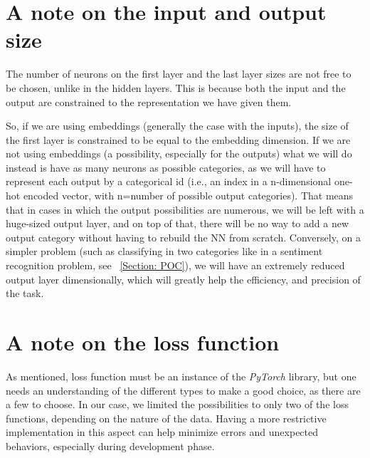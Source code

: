 \documentclass[a4paper, 11pt]{report}
\begin{document}
\section{A note on the input and output size}\label{Apx: input and output sizes}
   The number of neurons on the first layer and the last layer sizes are not free to be chosen, unlike in the hidden layers. This is because both the input and the output are constrained to the representation we have given them.

   So, if we are using embeddings (generally the case with the inputs), the size of the first layer is constrained to be equal to the embedding dimension. If we are not using embeddings (a possibility, especially for the outputs) what we will do instead is have as many neurons as possible categories, as we will have to represent each output by a categorical id (i.e., an index in a n-dimensional one-hot encoded vector, with n=number of possible output categories). That means that in cases in which the output possibilities are numerous, we will be left with a huge-sized output layer, and on top of that, there will be no way to add a new output category without having to rebuild the NN from scratch. Conversely, on a simpler problem (such as classifying in two categories like in a sentiment recognition problem, see ~\ref{Section: POC}), we will have an extremely reduced output layer dimensionally, which will greatly help the efficiency, and precision of the task.


\section{A note on the loss function}\label{Apx: A note on the loss functions}
    As mentioned, loss function must be an instance of the \textit{PyTorch} library, but one needs an understanding of the different types to make a good choice, as there are a few to choose. In our case, we limited the possibilities to only two of the loss functions, depending on the nature of the data. Having a more restrictive implementation in this aspect can help minimize errors and unexpected behaviors, especially during development phase.
\end{document}
